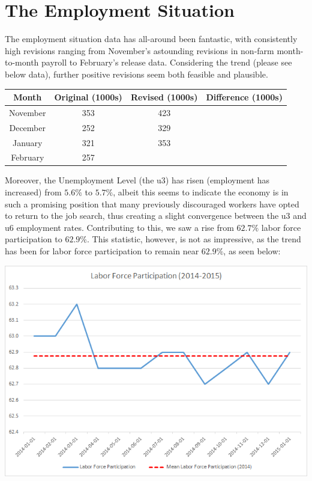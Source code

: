 \documentclass[11pt,letterpaper,english]{article}
\begin{document}
\section{The Employment Situation}
The employment situation data has all-around been fantastic, with consistently high revisions ranging from November's astounding revisions in non-farm month-to-month payroll to February's release data. Considering the trend (please see below data), further positive revisions seem both feasible and plausible.

\begin{center}
    \begin{tabular}{| c | c | c | c |}
    \hline
    Month       & Original (1000s) & Revised (1000s) & Difference (1000s) \\ \hline
    November    & 353 & 423 & \cellcolor{green}{+70} \\ \hline
    December    & 252 & 329 & \cellcolor{green}{+77} \\ \hline
    January     & 321 & 353 & \cellcolor{green}{+32} \\ \hline
    February    & 257 & \cellcolor{black}{} & \cellcolor{black}{} \\ \hline
    \end{tabular}
\end{center}

\noindent Moreover, the Unemployment Level (the u3) has risen (employment has increased) from $5.6\%$ to $5.7\%$, albeit this seems to indicate the economy is in such a promising position that many previously discouraged workers have opted to return to the job search, thus creating a slight convergence between the u3 and u6 employment rates. 
Contributing to this, we saw a rise from $62.7\%$ labor force participation to $62.9\%$. This statistic, however, is not as impressive, as the trend has been for labor force participation to remain near $62.9\%$, as seen below:

\vspace{10mm}
\includegraphics[scale=0.85]{LaborForceParticipation.png}
\vspace{10mm}
\end{document}
